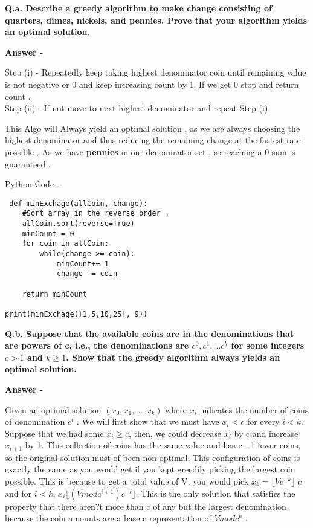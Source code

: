 \documentclass[5pt]{article}
\newcommand{\floor}[1]{\lfloor #1 \rfloor}
\begin{document}
 \textbf{Q.a. Describe a greedy algorithm to make change consisting of quarters, dimes, nickels, and pennies. Prove that your algorithm yields an optimal solution.}
 \setlength{\parskip}{1.2em}
\setlength{\parindent}{0em}

\textbf{Answer -}

 Step (i) - Repeatedly keep taking highest denominator coin until remaining value is not negative or 0 and keep increasing count by 1. If we get 0  stop and return count . \\
 Step (ii) - If not move to next highest denominator and repeat Step (i)

This Algo will Always yield an optimal solution , as we are always choosing the highest denominator and thus reducing the remaining change at the fastest rate possible . 
As we have \textbf{pennies} in our denominator set , so reaching a 0 sum is guaranteed . 

Python Code -

 \begin{lstlisting}
 def minExchage(allCoin, change):
    #Sort array in the reverse order .
    allCoin.sort(reverse=True)
    minCount = 0
    for coin in allCoin:
        while(change >= coin):
            minCount+= 1
            change -= coin

    return minCount
    
print(minExchage([1,5,10,25], 9))
 \end{lstlisting}
 
 
 \textbf{Q.b. Suppose that the available coins are in the denominations that are powers of c, i.e., the denominations are $c^0, c^1, ... c^k $ for some integers $c > 1$ and $k \geq 1$. Show that the greedy algorithm always yields an optimal solution.}
 \setlength{\parskip}{1.2em}
\setlength{\parindent}{0em}

\textbf{Answer -}

Given an optimal solution $(x_0, x_1, . . . , x_k)$ where $x_i$ indicates the number of coins of denomination $c^i$
. We will first show that we must have $x_i < c$ for
every $i < k$. Suppose that we had some $x_i \geq c$, then, we could decrease
$x_i$ by c and increase $x_{i+1}$ by 1. This collection of coins has the same value
and has c - 1 fewer coins, so the original solution must of been non-optimal.
This configuration of coins is exactly the same as you would get if you kept
greedily picking the largest coin possible. This is because to get a total value
of V, you would pick $x_k = \floor{V c^{-k}}$
c and for $i < k$, $x_i \floor{(V modc^{i+1})c^{-i}}$. This
is the only solution that satisfies the property that there aren?t more than c
of any but the largest denomination because the coin amounts are a base c
representation of $V modc^k$
.
 
\end{document}

